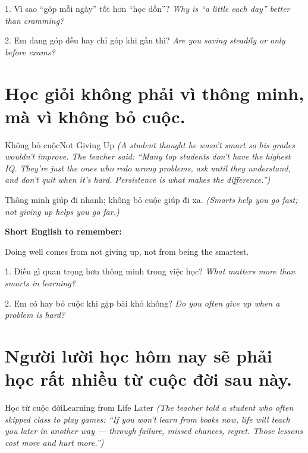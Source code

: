 \begin{tuhocnhanh}
1. Vì sao ``góp mỗi ngày'' tốt hơn ``học dồn''? \textit{Why is ``a little each day'' better than cramming?}

2. Em đang góp đều hay chỉ góp khi gần thi? \textit{Are you saving steadily or only before exams?}
\end{tuhocnhanh}
\ngancach

\section{Học giỏi không phải vì thông minh, mà vì không bỏ cuộc.}
\begin{truyen}{Không bỏ cuộc}{Not Giving Up}
\textit{(A student thought he wasn't smart so his grades wouldn't improve. The teacher said: ``Many top students don't have the highest IQ. They're just the ones who redo wrong problems, ask until they understand, and don't quit when it's hard. Persistence is what makes the difference.'')}
\end{truyen}

\begin{baihoc}
Thông minh giúp đi nhanh; không bỏ cuộc giúp đi xa.
\textit{(Smarts help you go fast; not giving up helps you go far.)}
\end{baihoc}

\begin{ghinhoanh}
\textbf{Short English to remember:}

Doing well comes from not giving up, not from being the smartest.

\end{ghinhoanh}

\begin{tuhocnhanh}
1. Điều gì quan trọng hơn thông minh trong việc học? \textit{What matters more than smarts in learning?}

2. Em có hay bỏ cuộc khi gặp bài khó không? \textit{Do you often give up when a problem is hard?}
\end{tuhocnhanh}
\ngancach

\section{Người lười học hôm nay sẽ phải học rất nhiều từ cuộc đời sau này.}
\begin{truyen}{Học từ cuộc đời}{Learning from Life Later}
\textit{(The teacher told a student who often skipped class to play games: ``If you won't learn from books now, life will teach you later in another way — through failure, missed chances, regret. Those lessons cost more and hurt more.'')}
\end{truyen}

